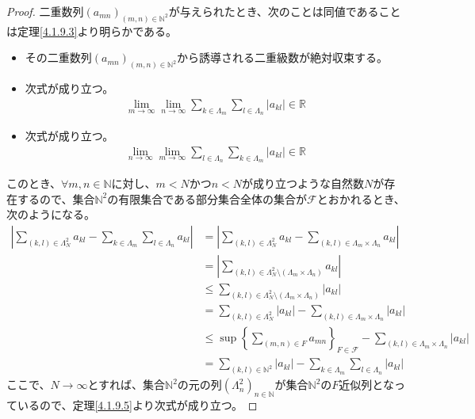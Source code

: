 \documentclass[dvipdfmx]{jsarticle}
\begin{document}
\begin{proof}
二重数列$\left( a_{mn} \right)_{(m,n) \in \mathbb{N}^{2}}$が与えられたとき、次のことは同値であることは定理\ref{4.1.9.3}より明らかである。
\begin{itemize}
\item
  その二重数列$\left( a_{mn} \right)_{(m,n) \in \mathbb{N}^{2}}$から誘導される二重級数が絶対収束する。
\item
  次式が成り立つ。
\begin{align*}
\lim_{m \rightarrow \infty}{\lim_{n \rightarrow \infty}{\sum_{k \in \varLambda_{m}}{\sum_{l \in \varLambda_{n}}\left| a_{kl} \right|}}} \in \mathbb{R}
\end{align*}
\item
  次式が成り立つ。
\begin{align*}
\lim_{n \rightarrow \infty}{\lim_{m \rightarrow \infty}{\sum_{l \in \varLambda_{n}}{\sum_{k \in \varLambda_{m}}\left| a_{kl} \right|}}} \in \mathbb{R}
\end{align*}
\end{itemize}\par
このとき、$\forall m,n \in \mathbb{N}$に対し、$m < N$かつ$n < N$が成り立つような自然数$N$が存在するので、集合$\mathbb{N}^{2}$の有限集合である部分集合全体の集合が$\mathcal{F}$とおかれるとき、次のようになる。
\begin{align*}
\left| \sum_{(k,l) \in \varLambda_{N}^{2}}a_{kl} - \sum_{k \in \varLambda_{m}}{\sum_{l \in \varLambda_{n}}a_{kl}} \right| &= \left| \sum_{(k,l) \in \varLambda_{N}^{2}}a_{kl} - \sum_{(k,l) \in \varLambda_{m} \times \varLambda_{n}}a_{kl} \right|\\
&= \left| \sum_{(k,l) \in \varLambda_{N}^{2} \setminus \left( \varLambda_{m} \times \varLambda_{n} \right)}a_{kl} \right|\\
&\leq \sum_{(k,l) \in \varLambda_{N}^{2} \setminus \left( \varLambda_{m} \times \varLambda_{n} \right)}\left| a_{kl} \right|\\
&= \sum_{(k,l) \in \varLambda_{N}^{2}}\left| a_{kl} \right| - \sum_{(k,l) \in \varLambda_{m} \times \varLambda_{n}}\left| a_{kl} \right|\\
&\leq \sup\left\{ \sum_{(m,n) \in F}a_{mn} \right\}_{F \in \mathcal{F}} - \sum_{(k,l) \in \varLambda_{m} \times \varLambda_{n}}\left| a_{kl} \right|\\
&= \sum_{(k,l) \in \mathbb{N}^{2}}\left| a_{kl} \right| - \sum_{k \in \varLambda_{m}}{\sum_{l \in \varLambda_{n}}\left| a_{kl} \right|}
\end{align*}
ここで、$N \rightarrow \infty$とすれば、集合$\mathbb{N}^{2}$の元の列$\left( \varLambda_{n}^{2} \right)_{n \in \mathbb{N}}$が集合$\mathbb{N}^{2}$の$F$近似列となっているので、定理\ref{4.1.9.5}より次式が成り立つ。

\end{proof}
\end{document}
